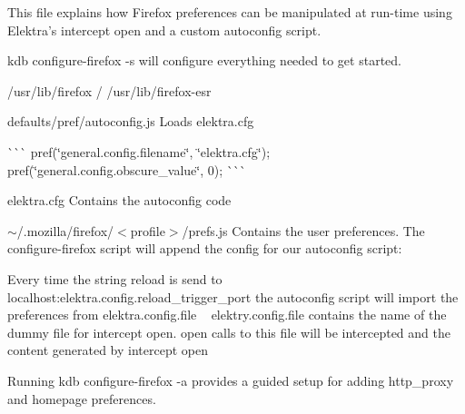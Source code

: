 This file explains how Firefox preferences can be manipulated at run-\/time using Elektra’s intercept open and a custom autoconfig script.

{\ttfamily kdb configure-\/firefox -\/s} will configure everything needed to get started.


\begin{DoxyItemize}
\item {\ttfamily /usr/lib/firefox} / {\ttfamily /usr/lib/firefox-\/esr}
\begin{DoxyItemize}
\item {\ttfamily defaults/pref/autoconfig.\+js} Loads {\ttfamily elektra.\+cfg}

\`{}\`{}\`{} pref(\char`\"{}general.\+config.\+filename\char`\"{}, \char`\"{}elektra.\+cfg\char`\"{}); pref(\char`\"{}general.\+config.\+obscure\+\_\+value\char`\"{}, 0); \`{}\`{}\`{}
\item {\ttfamily elektra.\+cfg} Contains the autoconfig code
\end{DoxyItemize}
\item {\ttfamily $\sim$/.mozilla/firefox/$<$profile$>$/prefs.js} Contains the user preferences. The configure-\/firefox script will append the config for our autoconfig script\+:
\end{DoxyItemize}


\begin{DoxyCode}{0}
\end{DoxyCode}


Every time the string {\ttfamily reload} is send to localhost\+:{\ttfamily elektra.\+config.\+reload\+\_\+trigger\+\_\+port} the autoconfig script will import the preferences from {\ttfamily elektra.\+config.\+file} ~\newline
 {\ttfamily elektry.\+config.\+file} contains the name of the dummy file for {\ttfamily intercept open}. {\ttfamily open} calls to this file will be intercepted and the content generated by {\ttfamily intercept open}

Running {\ttfamily kdb configure-\/firefox -\/a} provides a guided setup for adding http\+\_\+proxy and homepage preferences.


\begin{DoxyCode}{0}
\DoxyCodeLine{}
\DoxyCodeLine{}
\DoxyCodeLine{}
\DoxyCodeLine{}
\end{DoxyCode}


